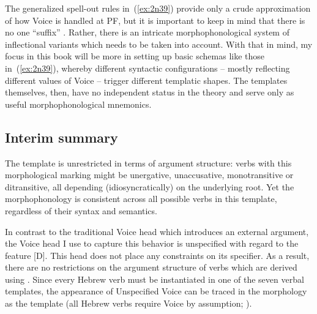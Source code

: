 \begin{exe}
\begin{xlist}
\begin{exe}
\begin{xlist}
\begin{exe}
\begin{xlist}
\begin{exe}
\begin{exe}
\begin{xlist}
\begin{exe}
\begin{xlist}
\begin{exe}
\begin{xlist}
\begin{exe}
\begin{xlist}
\begin{exe}
\begin{xlist}
\begin{exe}
\begin{xlist}
\begin{exe}
\begin{xlist}
\begin{exe}
\begin{xlist}
\begin{xlist}
\begin{exe}
\begin{xlist}
\begin{exe}
\begin{xlist}
\begin{exe}
\begin{xlist}
\begin{exe}
\begin{xlist}
\begin{exe}
\begin{xlist}
\begin{exe}
\begin{xlist}
\begin{exe}
\begin{xlist}
\begin{exe}
\begin{xlist}
\begin{exe}
\begin{xlist}
\begin{exe}
\begin{xlist}
\begin{exe}
\begin{xlist}
\begin{exe}
\begin{xlist}
\begin{xlist}
\begin{xlist}
\begin{exe}
\begin{xlist}
\begin{xlist}
\begin{xlist}
\begin{exe}
\begin{exe}
\begin{xlist}
The generalized spell-out rules in~(\ref{ex:2n39}) provide only a crude approximation of how Voice is handled at PF, but it is important to keep in mind that there is no one ``suffix'' {\tkal}. Rather, there is an intricate morphophonological system of inflectional variants which needs to be taken into account. With that in mind, my focus in this book will be more in setting up basic schemas like those in~(\ref{ex:2n39}), whereby different syntactic configurations -- mostly reflecting different values of Voice -- trigger different templatic shapes. The templates themselves, then, have no independent status in the theory and serve only as useful morphophonological mnemonics.

	\subsection{Interim summary} \label{voice:voice:sum}
The template {\tkal} is unrestricted in terms of argument structure: verbs with this morphological marking might be unergative, unaccusative, monotransitive or ditransitive, all depending (idiosyncratically) on the underlying root. Yet the morphophonology is consistent across all possible verbs in this template, regardless of their syntax and semantics.

In contrast to the traditional Voice head which introduces an external argument, the Voice head I use to capture this behavior is unspecified with regard to the  feature [D]. This head does not place any constraints on its specifier. As a result, there are no restrictions on the argument structure of verbs which are derived using . Since every Hebrew verb must be instantiated in one of the seven verbal templates, the appearance of Unspecified Voice can be traced in the morphology as the template {\tkal} (all Hebrew verbs require Voice by assumption; \citealt{arad05}).


\end{xlist}
\end{exe}
\end{exe}
\end{xlist}
\end{xlist}
\end{xlist}
\end{exe}
\end{xlist}
\end{xlist}
\end{xlist}
\end{exe}
\end{xlist}
\end{exe}
\end{xlist}
\end{exe}
\end{xlist}
\end{exe}
\end{xlist}
\end{exe}
\end{xlist}
\end{exe}
\end{xlist}
\end{exe}
\end{xlist}
\end{exe}
\end{xlist}
\end{exe}
\end{xlist}
\end{exe}
\end{xlist}
\end{exe}
\end{xlist}
\end{exe}
\end{xlist}
\end{xlist}
\end{exe}
\end{xlist}
\end{exe}
\end{xlist}
\end{exe}
\end{xlist}
\end{exe}
\end{xlist}
\end{exe}
\end{xlist}
\end{exe}
\end{xlist}
\end{exe}
\end{xlist}
\end{exe}
\end{exe}
\end{xlist}
\end{exe}
\end{xlist}
\end{exe}
\end{xlist}
\end{exe}

